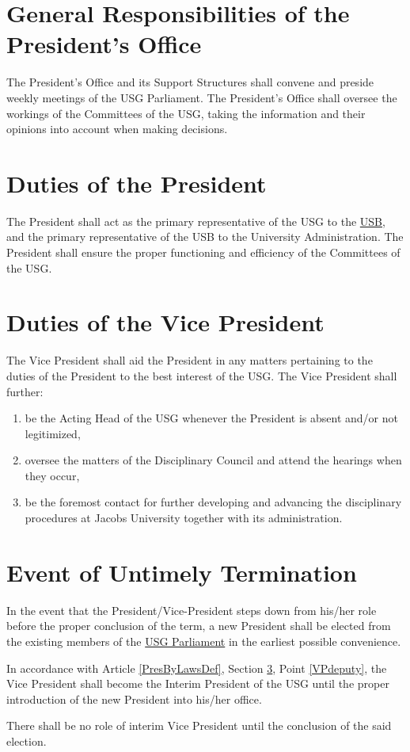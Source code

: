\label{PresByLawsDef}
\section{General Responsibilities of the President's Office}
The President's Office and its Support Structures shall convene and preside weekly meetings of the USG Parliament. The President's Office shall oversee the workings of the Committees of the USG, taking the information and their opinions into account when making decisions.

\section{Duties of the President}
\label{PresDef}
The President shall act as the primary representative of the USG to the \hyperref[studentbody]{USB}, and the primary representative of the USB to the University Administration.
The President shall ensure the proper functioning and efficiency of the Committees of the USG.


\section{Duties of the Vice President}
\label{VPDef}
The Vice President shall aid the President in any matters pertaining to the duties of the President to the best interest of the USG. The Vice President shall further:
\begin{enumerate}
\item \label{VPdeputy} be the Acting Head of the USG whenever the President is absent and/or not legitimized,
\item oversee the matters of the Disciplinary Council and attend the hearings when they occur,
\item be the foremost contact for further developing and advancing the disciplinary procedures at Jacobs University together with its administration.
\end{enumerate}


\section{Event of Untimely Termination}
In the event that the President/Vice-President steps down from his/her role before the proper conclusion of the term, a new President shall be elected from the existing members of the \hyperref[USGParliamentDef]{USG Parliament} in the earliest possible convenience. 
\begin{parenum}
\item In accordance with Article \ref{PresByLawsDef}, Section \ref{VPDef}, Point \ref{VPdeputy}, the Vice President shall become the Interim President of the USG until the proper introduction of the new President into his/her office.
\item There shall be no role of interim Vice President until the conclusion of the said election. 
\end{parenum}